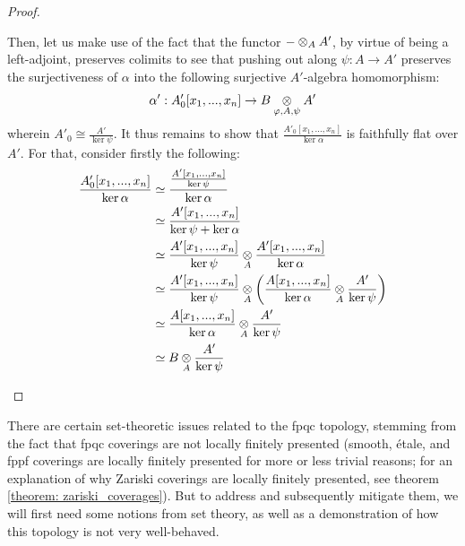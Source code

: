 \begin{proof}
\begin{enumerate}
                                Then, let us make use of the fact that the functor $- \tensor_A A'$, by virtue of being a left-adjoint, preserves colimits to see that pushing out along $\psi: A \to A'$ preserves the surjectiveness of $\alpha$ into the following surjective $A'$-algebra homomorphism:
                                    $$\alpha': A'_0[x_1, ..., x_n] \to B \tensor_{\varphi, A, \psi} A'$$
                                wherein $A'_0 \cong \frac{A'}{\ker \psi}$. It thus remains to show that $\frac{A'_0[x_1, ..., x_n]}{\ker \alpha}$ is faithfully flat over $A'$. For that, consider firstly the following:
                                    $$
                                        \begin{aligned}
                                            \frac{A'_0[x_1, ..., x_n]}{\ker \alpha} & \cong \frac{\frac{A'[x_1, ..., x_n]}{\ker \psi}}{\ker \alpha}
                                            \\
                                            & \cong \frac{A'[x_1, ..., x_n]}{\ker \psi + \ker \alpha}
                                            \\
                                            & \cong \frac{A'[x_1, ..., x_n]}{\ker \psi} \tensor_A \frac{A'[x_1, ..., x_n]}{\ker \alpha}
                                            \\
                                            & \cong \frac{A'[x_1, ..., x_n]}{\ker \psi} \tensor_A \left(\frac{A[x_1, ..., x_n]}{\ker \alpha} \tensor_A \frac{A'}{\ker \psi}\right)
                                            \\
                                            & \cong \frac{A[x_1, ..., x_n]}{\ker \alpha} \tensor_A \frac{A'}{\ker \psi}
                                            \\
                                            & \cong B \tensor_A \frac{A'}{\ker \psi}
                                        \end{aligned}
                                    $$
                                
                            \end{enumerate}
                        \end{proof}
                
                    There are certain set-theoretic issues related to the fpqc topology, stemming from the fact that fpqc coverings are not locally finitely presented (smooth, \'etale, and fppf coverings are locally finitely presented for more or less trivial reasons; for an explanation of why Zariski coverings are locally finitely presented, see theorem \ref{theorem: zariski_coverages}). But to address and subsequently mitigate them, we will first need some notions from set theory, as well as a demonstration of how this topology is not very well-behaved.
                    
